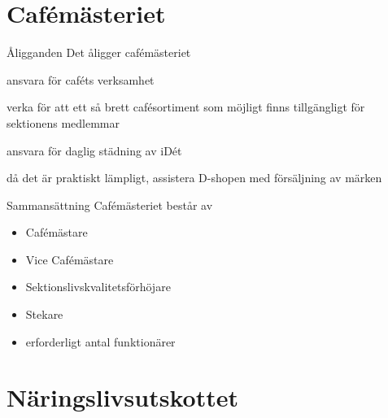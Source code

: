 \documentclass[pdfbookmarks,a4paper,11pt]{article}
\newlength{\itemcollength}
\newenvironment{reglemlista}{%
  \begin{list}{}{%
      \setlength{\labelwidth}{\itemcollength}%
      \setlength{\leftmargin}{\labelwidth + \labelsep}%
      \renewcommand{\makelabel}[1]{%
        \raisebox{0pt}[1ex][0pt]{%
          \makebox[\labelwidth][l]{%
            \parbox[t]{\itemcollength}{%
              \raggedright\hspace{0pt}##1}}}\hfill}%
      }}{%
  \end{list}}
\begin{document}
\section{Cafémästeriet}

\begin{reglemlista}

  \item[Åligganden]
    Det åligger cafémästeriet
    \begin{attlista}
      \item ansvara för caféts verksamhet
      \item verka för att ett så brett cafésortiment som möjligt finns tillgängligt för sektionens medlemmar
      \item ansvara för daglig städning av iDét
      \item då det är praktiskt lämpligt, assistera D-shopen med försäljning av märken
    \end{attlista}

  \item[Sammansättning]
    Cafémästeriet består av
    \begin{itemize}
      \item Cafémästare
      \item Vice Cafémästare
      \item Sektionslivskvalitetsförhöjare
      \item Stekare
      \item erforderligt antal funktionärer
    \end{itemize}
    
\end{reglemlista}

\section{Näringslivsutskottet}
\end{document}
